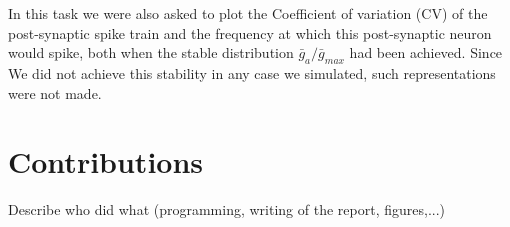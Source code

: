 \documentclass[a4paper,12pt,oneside]{article}
\begin{document}
		In this task we were also asked to plot the Coefficient of variation (CV) of the post-synaptic spike train and the frequency at which this post-synaptic neuron would spike, both when the stable distribution $\bar{g}_a/\bar{g}_{max}$ had been achieved. Since We did not achieve this stability in any case we simulated, such representations were not made. 

\section{Contributions}
Describe who did what (programming, writing of the report, figures,...)

\newpage


\end{document}
